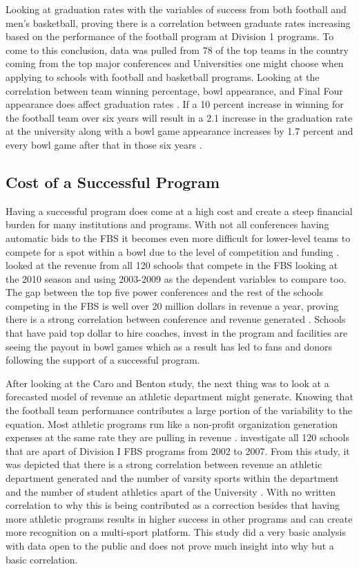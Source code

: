 \documentclass[12pt,english]{article}
\begin{document}
Looking at graduation rates with the variables of success from both football and men’s basketball, proving there is a correlation between graduate rates increasing based on the performance of the football program at Division 1 programs. To come to this conclusion, data was pulled from 78 of the top teams in the country coming from the top major conferences and Universities one might choose when applying to schools with football and basketball programs. Looking at the correlation between team winning percentage, bowl appearance, and Final Four appearance does affect graduation rates \citep{Tucker}. If a 10 percent increase in winning for the football team over six years will result in a 2.1 increase in the graduation rate at the university along with a bowl game appearance increases by 1.7 percent and every bowl game after that in those six years \citep{Tucker}. 

\subsection{Cost of a Successful Program}
Having a successful program does come at a high cost and create a steep financial burden for many institutions and programs. With not all conferences having automatic bids to the FBS it becomes even more difficult for lower-level teams to compete for a spot within a bowl due to the level of competition and funding \citep{Caro}. \citet{Caro} looked at the revenue from all 120 schools that compete in the FBS looking at the 2010 season and using 2003-2009 as the dependent variables to compare too. The gap between the top five power conferences and the rest of the schools competing in the FBS is well over 20 million dollars in revenue a year, proving there is a strong correlation between conference and revenue generated \citep{Caro}. Schools that have paid top dollar to hire coaches, invest in the program and facilities are seeing the payout in bowl games which as a result has led to fans and donors following the support of a successful program.

After looking at the Caro and Benton study, the next thing was to look at a forecasted model of revenue an athletic department might generate. Knowing that the football team performance contributes a large portion of the variability to the equation. Most athletic programs run like a non-profit organization generation expenses at the same rate they are pulling in revenue \citep{Mcevoy}. \citet{Mcevoy} investigate all 120 schools that are apart of Division I FBS programs from 2002 to 2007. From this study, it was depicted that there is a strong correlation between revenue an athletic department generated and the number of varsity sports within the department and the number of student athletics apart of the University \citep{Mcevoy}. With no written correlation to why this is being contributed as a correction besides that having more athletic programs results in higher success in other programs and can create more recognition on a multi-sport platform. This study did a very basic analysis with data open to the public and does not prove much insight into why but a basic correlation.
\end{document}
